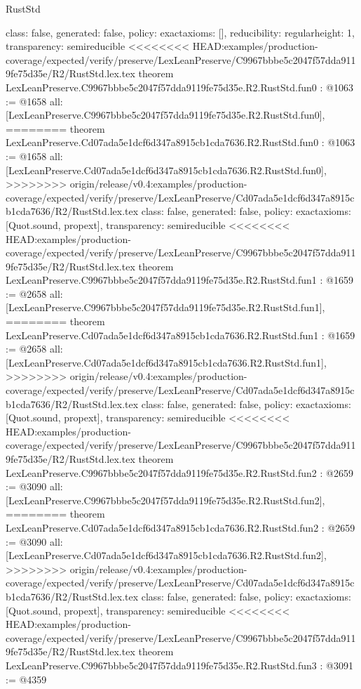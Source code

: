 \begin{lexlean}{RustStd}
\begin{coremodule}
{\begin{coremodule}
{{{  class: false,
  generated: false,
  policy: exact{axioms: []},
  reducibility: regular{height: 1},
  transparency: semireducible
}
<<<<<<<< HEAD:examples/production-coverage/expected/verify/preserve/LexLeanPreserve/C9967bbbe5c2047f57dda9119fe75d35e/R2/RustStd.lex.tex
theorem LexLeanPreserve.C9967bbbe5c2047f57dda9119fe75d35e.R2.RustStd.fun0 : @1063 := @1658 {
  all: [LexLeanPreserve.C9967bbbe5c2047f57dda9119fe75d35e.R2.RustStd.fun0],
========
theorem LexLeanPreserve.Cd07ada5e1dcf6d347a8915cb1cda7636.R2.RustStd.fun0 : @1063 := @1658 {
  all: [LexLeanPreserve.Cd07ada5e1dcf6d347a8915cb1cda7636.R2.RustStd.fun0],
>>>>>>>> origin/release/v0.4:examples/production-coverage/expected/verify/preserve/LexLeanPreserve/Cd07ada5e1dcf6d347a8915cb1cda7636/R2/RustStd.lex.tex
  class: false,
  generated: false,
  policy: exact{axioms: [Quot.sound, propext]},
  transparency: semireducible
}
<<<<<<<< HEAD:examples/production-coverage/expected/verify/preserve/LexLeanPreserve/C9967bbbe5c2047f57dda9119fe75d35e/R2/RustStd.lex.tex
theorem LexLeanPreserve.C9967bbbe5c2047f57dda9119fe75d35e.R2.RustStd.fun1 : @1659 := @2658 {
  all: [LexLeanPreserve.C9967bbbe5c2047f57dda9119fe75d35e.R2.RustStd.fun1],
========
theorem LexLeanPreserve.Cd07ada5e1dcf6d347a8915cb1cda7636.R2.RustStd.fun1 : @1659 := @2658 {
  all: [LexLeanPreserve.Cd07ada5e1dcf6d347a8915cb1cda7636.R2.RustStd.fun1],
>>>>>>>> origin/release/v0.4:examples/production-coverage/expected/verify/preserve/LexLeanPreserve/Cd07ada5e1dcf6d347a8915cb1cda7636/R2/RustStd.lex.tex
  class: false,
  generated: false,
  policy: exact{axioms: [Quot.sound, propext]},
  transparency: semireducible
}
<<<<<<<< HEAD:examples/production-coverage/expected/verify/preserve/LexLeanPreserve/C9967bbbe5c2047f57dda9119fe75d35e/R2/RustStd.lex.tex
theorem LexLeanPreserve.C9967bbbe5c2047f57dda9119fe75d35e.R2.RustStd.fun2 : @2659 := @3090 {
  all: [LexLeanPreserve.C9967bbbe5c2047f57dda9119fe75d35e.R2.RustStd.fun2],
========
theorem LexLeanPreserve.Cd07ada5e1dcf6d347a8915cb1cda7636.R2.RustStd.fun2 : @2659 := @3090 {
  all: [LexLeanPreserve.Cd07ada5e1dcf6d347a8915cb1cda7636.R2.RustStd.fun2],
>>>>>>>> origin/release/v0.4:examples/production-coverage/expected/verify/preserve/LexLeanPreserve/Cd07ada5e1dcf6d347a8915cb1cda7636/R2/RustStd.lex.tex
  class: false,
  generated: false,
  policy: exact{axioms: [Quot.sound, propext]},
  transparency: semireducible
}
<<<<<<<< HEAD:examples/production-coverage/expected/verify/preserve/LexLeanPreserve/C9967bbbe5c2047f57dda9119fe75d35e/R2/RustStd.lex.tex
theorem LexLeanPreserve.C9967bbbe5c2047f57dda9119fe75d35e.R2.RustStd.fun3 : @3091 := @4359 {
}}}}}}
\end{coremodule}}
\end{coremodule}
\end{lexlean}
